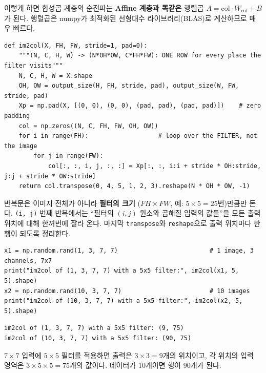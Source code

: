 \documentclass[11pt,a4paper]{article}
\begin{document}
이렇게 하면 합성곱 계층의 순전파는 \textbf{Affine 계층과 똑같은} 행렬곱 $A=\text{col}\cdot W_{\text{col}}+B$가 된다.
행렬곱은 numpy가 최적화된 선형대수 라이브러리(BLAS)로 계산하므로 매우 빠르다.
\begin{lstlisting}
def im2col(X, FH, FW, stride=1, pad=0):
    """(N, C, H, W) -> (N*OH*OW, C*FH*FW): ONE ROW for every place the filter visits"""
    N, C, H, W = X.shape
    OH, OW = output_size(H, FH, stride, pad), output_size(W, FW, stride, pad)
    Xp = np.pad(X, [(0, 0), (0, 0), (pad, pad), (pad, pad)])    # zero padding
    col = np.zeros((N, C, FH, FW, OH, OW))
    for i in range(FH):                   # loop over the FILTER, not the image
        for j in range(FW):
            col[:, :, i, j, :, :] = Xp[:, :, i:i + stride * OH:stride, j:j + stride * OW:stride]
    return col.transpose(0, 4, 5, 1, 2, 3).reshape(N * OH * OW, -1)
\end{lstlisting}
반복문은 이미지 전체가 아니라 \textbf{필터의 크기} ($FH\times FW$, 예: $5\times5=25$번)만큼만 돈다.
\texttt{(i, j)} 번째 반복에서는 ``필터의 $(i,j)$ 원소와 곱해질 입력의 값들''을 모든 출력 위치에 대해 한꺼번에 잘라 온다.
마지막 \texttt{transpose}와 \texttt{reshape}으로 출력 위치마다 한 행이 되도록 정리한다.
\begin{lstlisting}
x1 = np.random.rand(1, 3, 7, 7)                         # 1 image, 3 channels, 7x7
print("im2col of (1, 3, 7, 7) with a 5x5 filter:", im2col(x1, 5, 5).shape)
x2 = np.random.rand(10, 3, 7, 7)                        # 10 images
print("im2col of (10, 3, 7, 7) with a 5x5 filter:", im2col(x2, 5, 5).shape)
\end{lstlisting}
\begin{lstlisting}[language={},numbers=none]
im2col of (1, 3, 7, 7) with a 5x5 filter: (9, 75)
im2col of (10, 3, 7, 7) with a 5x5 filter: (90, 75)
\end{lstlisting}
$7\times7$ 입력에 $5\times5$ 필터를 적용하면 출력은 $3\times3=9$개의 위치이고,
각 위치의 입력 영역은 $3\times5\times5=75$개의 값이다. 데이터가 $10$개이면 행이 $90$개가 된다.
\end{document}
